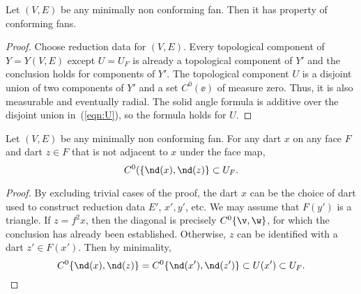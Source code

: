 \begin{lemma}[] Let $(V,E)$ be any minimally
non conforming fan.  Then it has property  of
conforming fans.
\end{lemma}

\begin{proof} Choose reduction data for $(V,E)$.  Every topological
component of $Y=Y(V,E)$ except $U=U_F$ is already a topological
component of $Y'$ and the conclusion holds for components of $Y'$.
The topological component $U$ is a disjoint union of two components
of $Y'$ and a set $C^0(\ee)$ of measure zero.  Thus, it is also
measurable and eventually radial.  The solid angle formula is
additive over the disjoint union in~(\ref{eqn:U}), so the formula
holds for $U$.
\end{proof}
%


\begin{lemma}[] Let $(V,E)$ be any minimally
non conforming fan.  For any dart $x$ on any face $F$ and dart $z\in
F$ that is not adjacent to $x$ under the face map,
\begin{displaymath}
C^0(\{\nd(x),\nd(z)\} \subset U_F.
\end{displaymath}
\end{lemma}

\begin{proof}  
  By excluding trivial cases of the proof, the dart $x$ can be the
  choice of dart used to construct reduction data $E'$, $x',y'$, etc. We may
  assume that $F(y')$ is a triangle.  If $z=f^2x$, then the diagonal
  is precisely $C^0\{\v,\w\}$, for which the conclusion has already
  been established.  Otherwise, $z$ can be identified with a dart
  $z'\in F(x')$.  Then by minimality,
\begin{displaymath}
C^0\{\nd(x),\nd(z)\} = C^0\{\nd(x'),\nd(z')\} \subset U(x') \subset U_F.
\end{displaymath}
\end{proof}


